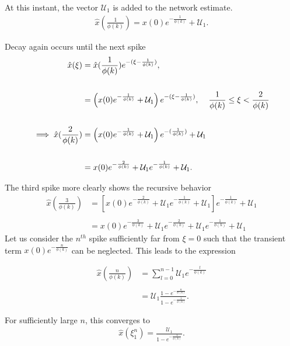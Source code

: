 \begin{enumerate}
 At this instant, the vector $\mathcal{U}_1$ is added to the network estimate.
 \begin{align*}
 \hat{x}( \frac{1}{\phi(k)}) =  x(0) e^{- \frac{1}{\phi(k)}} + \mathcal{U}_1.
 \end{align*}
 
Decay again occurs until the next spike
\begin{align*}
\hat{x}(\xi) &= \hat{x}(\frac{1}{\phi(k)}) e^{-(\xi - \frac{1}{\phi(k)})}, \\
\\
&= \left( x(0) e^{- \frac{1}{\phi(k)}} + \mathcal{U}_1 \right)e^{-(\xi - \frac{1}{\phi(k)})} , \hspace{4mm} 
\frac{1}{\phi(k)} \leq \xi < \frac{2}{\phi(k)}\\
\\
\implies
\hat{x}(\frac{2}{\phi(k)}) &= \left( x(0) e^{- \frac{1}{\phi(k)}} + \mathcal{U}_1 \right) e^{-(\frac{1}{\phi(k)})} + \mathcal{U}_1\\
\\
&= x(0)
e^{-\frac{2}{\phi(k)}} + \mathcal{U}_1 e^{-\frac{1}{\phi(k)}} 
+ \mathcal{U}_1.
\end{align*}

The third spike more clearly shows the recursive behavior
\begin{align*}
\hat{x}(\frac{3}{\phi(k)}) &= \left[x(0)
e^{-\frac{2}{\phi(k)}} + \mathcal{U}_1 e^{-\frac{1}{\phi(k)}} 
+ \mathcal{U}_1\right] e^{-\frac{1}{\phi(k)}} + \mathcal{U}_1\\
\\
&= x(0) e^{-\frac{3}{\phi(k)}} + \mathcal{U}_1 e^{-\frac{2}{\phi(k)}} 
+ \mathcal{U}_1 e^{-\frac{1}{\phi(k)}} + \mathcal{U}_1
\end{align*}
Let us consider the $n^{th}$ spike sufficiently far from $\xi=0$ such that the transient term $x(0)e^{-\frac{n}{\phi(k)}}$ can be neglected. This leads to the expression

\begin{align*}
\hat{x}(\frac{n}{\phi(k)}) &= \sum_{l=0}^{n-1} \mathcal{U}_1 e^{- \frac{l}{\phi(k)}}  \\
\\
&= \mathcal{U}_1 \frac
{ 1 - e^{-\frac{n}{\phi(k)}}  }
{ 1 - e^{-\frac{1}{\phi(k)}}  }.
\end{align*}

For sufficiently large $n$, this converges to 
\begin{align}
\label{eq:steady_state_estimate_const_driving}
\hat{x}(\xi_1^n) = \frac{\mathcal{U}_1}{1 - e^{-\frac{1}{\phi(k)}}}.
\end{align}



\end{enumerate}
